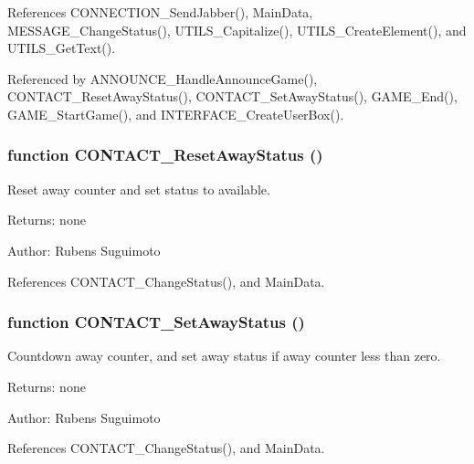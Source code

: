References CONNECTION\_\-SendJabber(), MainData, MESSAGE\_\-ChangeStatus(), UTILS\_\-Capitalize(), UTILS\_\-CreateElement(), and UTILS\_\-GetText().

Referenced by ANNOUNCE\_\-HandleAnnounceGame(), CONTACT\_\-ResetAwayStatus(), CONTACT\_\-SetAwayStatus(), GAME\_\-End(), GAME\_\-StartGame(), and INTERFACE\_\-CreateUserBox().
\subsubsection[CONTACT\_\-ResetAwayStatus]{\setlength{\rightskip}{0pt plus 5cm}function CONTACT\_\-ResetAwayStatus ()}\label{status_8js_f31be6a45d3637b341a5b304839b6dcf}


Reset away counter and set status to available. 

\begin{Desc}
\item[Returns:]none \end{Desc}
\begin{Desc}
\item[Author:]Rubens Suguimoto \end{Desc}


References CONTACT\_\-ChangeStatus(), and MainData.
\subsubsection[CONTACT\_\-SetAwayStatus]{\setlength{\rightskip}{0pt plus 5cm}function CONTACT\_\-SetAwayStatus ()}\label{status_8js_79321527ec0e9a4f334ba71daf2806c3}


Countdown away counter, and set away status if away counter less than zero. 

\begin{Desc}
\item[Returns:]none \end{Desc}
\begin{Desc}
\item[Author:]Rubens Suguimoto \end{Desc}


References CONTACT\_\-ChangeStatus(), and MainData.
